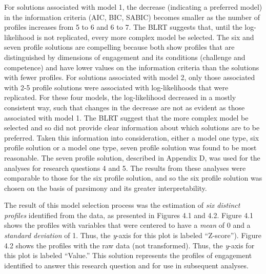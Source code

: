 \documentclass[]{book}
\theoremstyle{definition}
\theoremstyle{definition}
\theoremstyle{definition}
\theoremstyle{remark}
\begin{document}
For solutions associated with model 1, the decrease (indicating a
preferred model) in the information criteria (AIC, BIC, SABIC) becomes
smaller as the number of profiles increases from 5 to 6 and 6 to 7. The
BLRT suggests that, until the log-likelihood is not replicated, every
more complex model be selected. The six and seven profile solutions are
compelling because both show profiles that are distinguished by
dimensions of engagement and its conditions (challenge and competence)
and have lower values on the information criteria than the solutions
with fewer profiles. For solutions associated with model 2, only those
associated with 2-5 profile solutions were associated with
log-likelihoods that were replicated. For these four models, the
log-likelihood decreased in a mostly consistent way, such that changes
in the decrease are not as evident as those associated with model 1. The
BLRT suggest that the more complex model be selected and so did not
provide clear information about which solutions are to be preferred.
Taken this information into consideration, either a model one type, six
profile solution or a model one type, seven profile solution was found
to be most reasonable. The seven profile solution, described in Appendix
D, was used for the analyses for research questions 4 and 5. The results
from these analyses were comparable to those for the six profile
solution, and so the six profile solution was chosen on the basis of
parsimony and its greater interpretability.

The result of this model selection process was the estimation of
\emph{six distinct profiles} identified from the data, as presented in
Figures 4.1 and 4.2. Figure 4.1 shows the profiles with variables that
were centered to have a \emph{mean} of 0 and a \emph{standard deviation}
of 1. Thus, the \emph{y}-axis for this plot is labeled ``Z-score'').
Figure 4.2 shows the profiles with the raw data (not transformed). Thus,
the \emph{y}-axis for this plot is labeled ``Value.'' This solution
represents the profiles of engagement identified to answer this research
question and for use in subsequent analyses.
\end{document}
